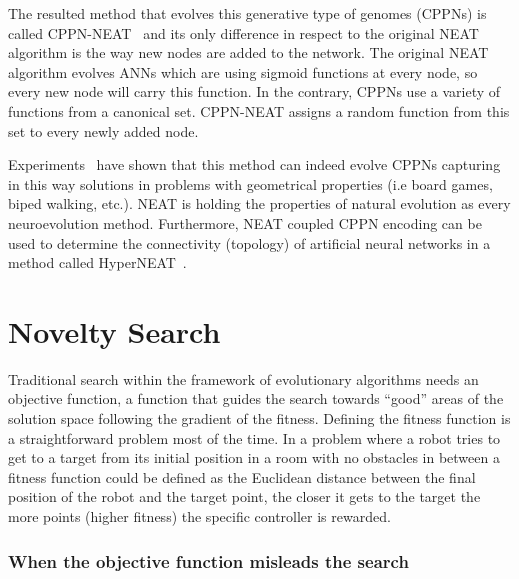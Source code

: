 The resulted method that evolves this generative type of genomes (CPPNs) is called CPPN-NEAT~\citep{stanley2007compositional} and its only difference in respect to the original NEAT algorithm is the way new nodes are added to the network. The original NEAT algorithm evolves ANNs which are using sigmoid functions at every node, so every new node will carry this function.
In the contrary, CPPNs use a variety of functions from a canonical set. CPPN-NEAT assigns a random function from this set to every newly added node. 

Experiments~\citep{stanley2007compositional} have shown that this method can indeed evolve CPPNs capturing in this way solutions in problems with geometrical properties (i.e board games, biped walking, etc.). NEAT is holding the properties of natural evolution as every neuroevolution method. Furthermore, NEAT coupled CPPN encoding can be used to determine the connectivity (topology) of artificial neural networks in  a method called HyperNEAT~\citep{stanley2009hypercube}.




\section{Novelty Search}
\label{NoveltySearch}

Traditional search within the framework of evolutionary algorithms needs an objective function, a function that guides the search towards ``good'' areas of the solution space following the gradient of the fitness. Defining the fitness function is a straightforward problem most of the time. In a problem where a robot tries to get to a target from its initial position in a room with no obstacles in between a fitness function could be defined as the Euclidean distance between the final position of the robot and the target point, the closer it gets to the target the more points (higher fitness) the specific controller is rewarded.

\subsubsection*{When the objective function misleads the search}

